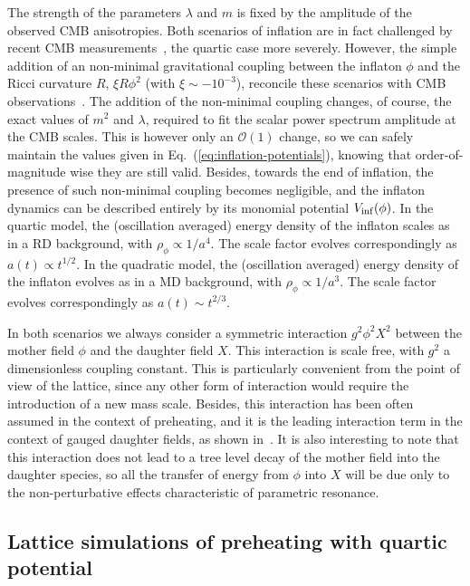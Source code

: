 \documentclass[a4paper,11pt]{article}
\begin{document}
The strength of the parameters $\lambda$ and $m$ is fixed by the amplitude of the observed CMB anisotropies. Both scenarios of inflation are in fact challenged by recent CMB measurements~\cite{Ade:2015lrj}, the quartic case more severely. However, the simple addition of an non-minimal gravitational coupling between the inflaton $\phi$ and the Ricci curvature $R$, $\xi R\phi^2$ (with $\xi \sim -10^{-3}$), reconcile these scenarios with CMB observations~\cite{Tsujikawa:2013ila}. The addition of the non-minimal coupling changes, of course, the exact values of $m^2$ and $\lambda$, required to fit the scalar power spectrum amplitude at the CMB scales. This is however only an $\mathcal{O}(1)$ change, so we can safely maintain the values given in Eq.~(\ref{eq:inflation-potentials}), knowing that order-of-magnitude wise they are still valid. Besides, towards the end of inflation, the presence of such non-minimal coupling becomes negligible, and the inflaton dynamics can be described entirely by its monomial potential $V_{\rm inf}(\phi)$. In the quartic model, the (oscillation averaged) energy density of the inflaton scales as in a RD background, with $\rho_\phi \propto 1/a^4$. The scale factor evolves correspondingly as $a(t) \propto t^{1/2}$. In the quadratic model, the (oscillation averaged) energy density of the inflaton evolves as in a MD background, with $\rho_\phi \propto 1/a^3$. The scale factor evolves correspondingly as $a(t) \sim t^{2/3}$. 

In both scenarios we always consider a symmetric interaction $g^2\phi^2 X^2$ between the mother field $\phi$ and the daughter field $X$. This interaction is scale free, with $g^2$ a dimensionless coupling constant. This is particularly convenient from the point of view of the lattice, since any other form of interaction would require the introduction of a new mass scale. Besides, this interaction has been often assumed in the context of preheating, and it is the leading interaction term in the context of gauged daughter fields, as shown in~\cite{Figueroa:2015rqa,Lozanov:2016pac}. It is also interesting to note that this interaction does not lead to a tree level decay of the mother field into the daughter species, so all the transfer of energy from $\phi$ into $X$ will be due only to the non-perturbative effects characteristic of parametric resonance.

\subsection{Lattice simulations of preheating with quartic potential}
\label{sec:lphi4-results}
\end{document}
